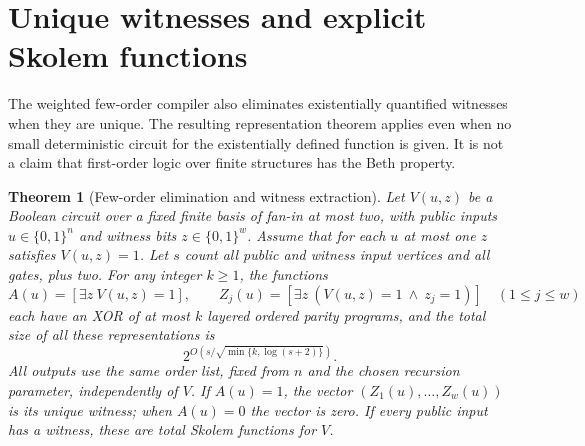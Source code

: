 \documentclass[11pt]{article}
\newtheorem{theorem}{Theorem}[section]
\theoremstyle{definition}
\theoremstyle{remark}
\begin{document}
\section{Unique witnesses and explicit Skolem functions}
\label{sec:skolem}

The weighted few-order compiler also eliminates existentially
quantified witnesses when they are unique. The resulting representation
theorem applies even when no small deterministic circuit for the
existentially defined function is given. It is not a claim that
first-order logic over finite structures has the Beth property.

\begin{theorem}[Few-order elimination and witness extraction]
\label{thm:few-order-skolem}
Let $V(u,z)$ be a Boolean circuit over a fixed finite basis of fan-in
at most two, with public inputs
$u\in\{0,1\}^n$ and witness bits $z\in\{0,1\}^w$. Assume that for
each $u$ at most one $z$ satisfies $V(u,z)=1$. Let $s$ count all
public and witness input vertices and all gates, plus two.
For any integer $k\ge1$, the functions
\[
 A(u)=[\exists z\ V(u,z)=1],\qquad
 Z_j(u)=[\exists z\ (V(u,z)=1\ \wedge\ z_j=1)]
 \quad(1\le j\le w)
\]
each have an XOR of at most $k$ layered ordered parity programs,
and the total size of all these representations is
\[
 2^{O\!\left(s/\sqrt{\min\{k,\log(s+2)\}}\right)}.
\]
All outputs use the same order list, fixed from $n$ and the chosen
recursion parameter, independently of $V$. If $A(u)=1$, the vector
$(Z_1(u),\ldots,Z_w(u))$ is its unique witness; when $A(u)=0$ the
vector is zero. If every public input has a witness, these are total
Skolem functions for $V$.
\end{theorem}
\end{document}

